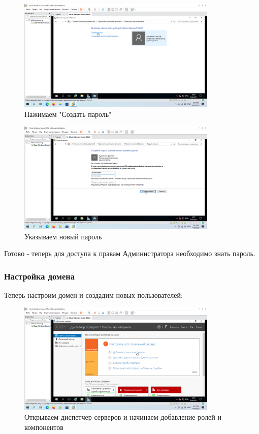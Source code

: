 \documentclass[a4paper]{article}
\begin{document}
  \begin{figure}[H]
    \centering
    \includegraphics[width=0.85\textwidth]{Screenshot_36}
    \caption{Нажимаем "Создать пароль"}
    \label{img:36}
  \end{figure}

  \begin{figure}[H]
    \centering
    \includegraphics[width=0.85\textwidth]{Screenshot_37}
    \caption{Указываем новый пароль}
    \label{img:37}
  \end{figure}

  Готово - теперь для доступа к правам Администратора необходимо знать пароль.

  \subsubsection{Настройка домена}

  Теперь настроим домен и создадим новых пользователей:

  \begin{figure}[H]
    \centering
    \includegraphics[width=0.85\textwidth]{Screenshot_38}
    \caption{Открываем диспетчер серверов и начинаем добавление ролей и компонентов}
    \label{img:38}
  \end{figure}
\end{document}
